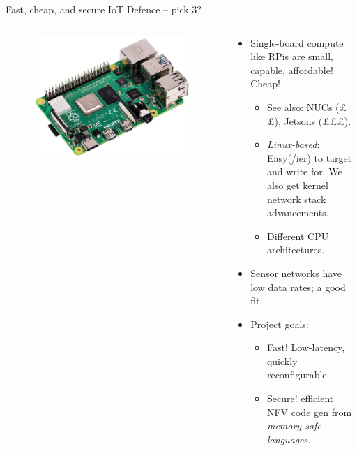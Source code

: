 \documentclass[aspectratio=169,xcolor={dvipsnames}
,handout
]{beamer}
\begin{document}
\begin{frame}{Fast, cheap, and secure IoT Defence -- pick 3?}
	\begin{columns}
		\begin{column}{0.4\linewidth}
			\begin{figure}
				\includegraphics[keepaspectratio,width=\linewidth]{images/rpi}
			\end{figure}
		\end{column}
		\begin{column}{0.6\linewidth}
			\begin{itemize}
				\item Single-board compute like RPis are small, capable, affordable! \alert{Cheap!}
				\begin{itemize}
					\item See also: NUCs (££), Jetsons (£££).
					\item \emph{Linux-based}: Easy(/ier) to target and write for. \alert{We also get kernel network stack advancements.}
					\item Different CPU architectures.
				\end{itemize}
				\item Sensor networks have low data rates; a good fit.
				\item Project goals:
				\begin{itemize}
					\item \alert{Fast!} Low-latency, quickly reconfigurable.
					\item \alert{Secure!} efficient NFV code gen from \emph{memory-safe languages}.
				\end{itemize}
			\end{itemize}
		\end{column}
	\end{columns}
\end{frame}
\end{document}
